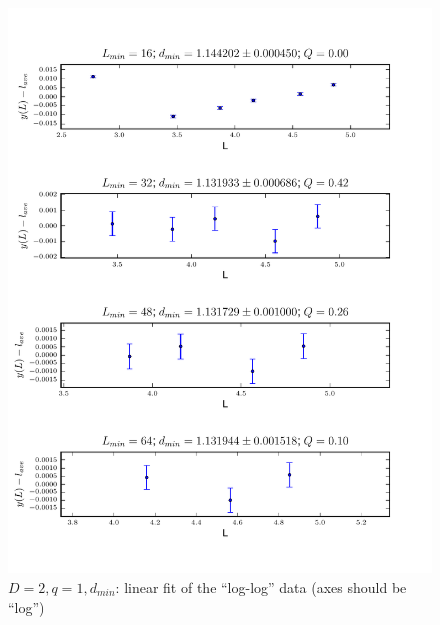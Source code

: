 \documentclass[pre,preprint]{revtex4}
\begin{document}
\begin{figure}[htp]
\centering
\includegraphics[width=.9\textwidth]{figures/d_min_D2q1_4601_fig_straightline}
\caption{$D=2, q=1, d_{min}$: linear fit of the ``log-log'' data (axes should be ``log'')}\label{fig:b}
\end{figure}
\end{document}
